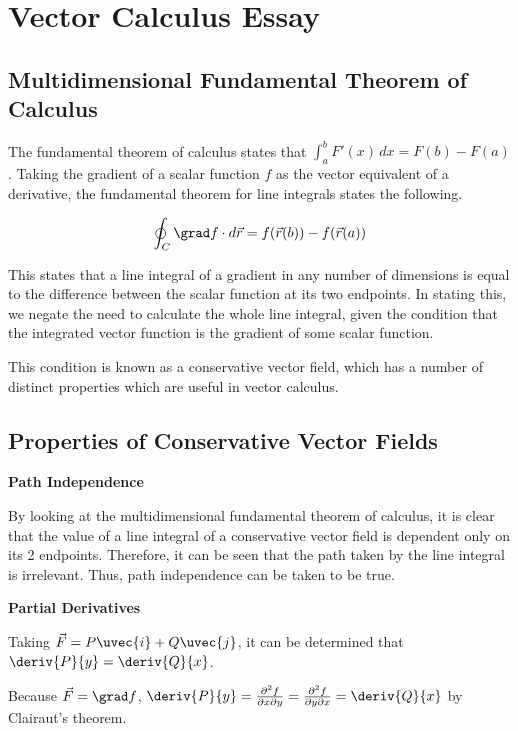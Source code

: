 \documentclass{notes}
\begin{document}
\section*{Vector Calculus Essay}

\subsection*{Multidimensional Fundamental Theorem of Calculus}

The fundamental theorem of calculus states that \(\int_{a}^{b}F'(x)\,dx = F(b) - F(a)\). Taking the gradient of a scalar function \(f\) as the vector equivalent of a derivative, the fundamental theorem for line integrals states the following.

\begin{equation}
    \oint_C \grad f \cdot d\vec{r} = f(\vec{r}(b)) - f(\vec{r}(a))
\end{equation}

This states that a line integral of a gradient in any number of dimensions is equal to the difference between the scalar function at its two endpoints. In stating this, we negate the need to calculate the whole line integral, given the condition that the integrated vector function is the gradient of some scalar function.

This condition is known as a conservative vector field, which has a number of distinct properties which are useful in vector calculus.

\subsection*{Properties of Conservative Vector Fields}

\textbf{Path Independence}

By looking at the multidimensional fundamental theorem of calculus, it is clear that the value of a line integral of a conservative vector field is dependent only on its 2 endpoints. Therefore, it can be seen that the path taken by the line integral is irrelevant. Thus, path independence can be taken to be true.

\textbf{Partial Derivatives}

Taking \(\vec{F} = P \uvec{i} + Q \uvec{j}\), it can be determined that \(\deriv{P}{y} = \deriv{Q}{x}\).

Because \(\vec{F} = \grad f\), \(\deriv{P}{y} = \frac{\partial^2 f}{\partial x \partial y} =\frac{\partial^2 f}{\partial y \partial x} = \deriv{Q}{x}\) by Clairaut's theorem.
\end{document}
